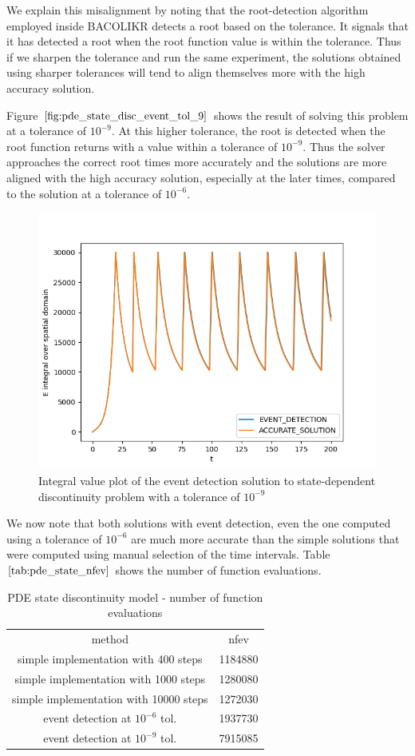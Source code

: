 We explain this misalignment by noting that the root-detection algorithm employed inside BACOLIKR detects a root based on the tolerance. It signals that it has detected a root when the root function value is within the tolerance. Thus if we sharpen the tolerance and run the same experiment, the solutions obtained using sharper tolerances will tend to align themselves more with the high accuracy solution.

Figure $\ref{fig:pde_state_disc_event_tol_9}$ shows the result of solving this problem at a tolerance of $10^{-9}$. At this higher tolerance, the root is detected when the root function returns with a value within a tolerance of $10^{-9}$. Thus the solver approaches the correct root times more accurately and the solutions are more aligned with the high accuracy solution, especially at the later times, compared to the solution at a tolerance of $10^{-6}$.


\begin{figure}[H]
\centering
\includegraphics[width=0.7\linewidth]{./figures/pde_state_disc_event_tol_9}
\caption{Integral value plot of the event detection solution to state-dependent discontinuity problem with a tolerance of $10^{-9}$}
\label{fig:pde_state_disc_event_tol_9}
\end{figure}

We now note that both solutions with event detection, even the one computed using a tolerance of $10^{-6}$ are much more accurate than the simple solutions that were computed using manual selection of the time intervals. Table $\ref{tab:pde_state_nfev}$ shows the number of function evaluations. 

\begin{table}[h]
\caption {PDE state discontinuity model - number of function evaluations} 
\label{tab:pde_state_nfev}
\begin{center}
\begin{tabular}{ c c } 
method & nfev \\ 
simple implementation with 400 steps   & 1184880 \\
simple implementation with 1000 steps  & 1280080 \\
simple implementation with 10000 steps & 1272030 \\
event detection at $10^{-6}$ tol.     & 1937730 \\
event detection at $10^{-9}$ tol.     & 7915085 \\
\end{tabular}
\end{center}
\end{table}

